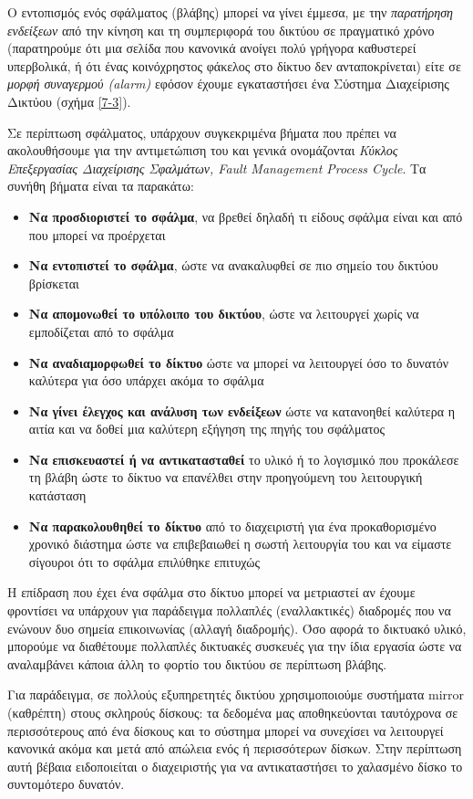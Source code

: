 Ο εντοπισμός ενός σφάλματος (βλάβης) μπορεί να γίνει έμμεσα, με την \emph{παρατήρηση ενδείξεων} από την κίνηση και τη συμπεριφορά του δικτύου σε πραγματικό χρόνο (παρατηρούμε ότι μια σελίδα που κανονικά ανοίγει πολύ γρήγορα καθυστερεί υπερβολικά, ή ότι ένας κοινόχρηστος φάκελος στο δίκτυο δεν ανταποκρίνεται) είτε σε \emph{μορφή συναγερμού (alarm)} εφόσον έχουμε εγκαταστήσει ένα Σύστημα Διαχείρισης Δικτύου (σχήμα \ref{7-3}). 

Σε περίπτωση σφάλματος, υπάρχουν συγκεκριμένα βήματα που πρέπει να ακολουθήσουμε για την αντιμετώπιση του και γενικά ονομάζονται \emph{Κύκλος Επεξεργασίας Διαχείρισης Σφαλμάτων, Fault Management Process Cycle}. Τα συνήθη βήματα είναι τα παρακάτω:

\begin{itemize}
\item \textbf{Να προσδιοριστεί το σφάλμα}, να βρεθεί δηλαδή τι είδους σφάλμα είναι και από που μπορεί να προέρχεται
\item \textbf{Να εντοπιστεί το σφάλμα}, ώστε να ανακαλυφθεί σε πιο σημείο του δικτύου βρίσκεται
\item \textbf{Να απομονωθεί το υπόλοιπο του δικτύου}, ώστε να λειτουργεί χωρίς να εμποδίζεται από το σφάλμα
\item \textbf{Να αναδιαμορφωθεί το δίκτυο} ώστε να μπορεί να λειτουργεί όσο το δυνατόν καλύτερα για όσο υπάρχει ακόμα το σφάλμα
\item \textbf{Να γίνει έλεγχος και ανάλυση των ενδείξεων} ώστε να κατανοηθεί καλύτερα η αιτία και να δοθεί μια καλύτερη εξήγηση της πηγής του σφάλματος
\item \textbf{Να επισκευαστεί ή να αντικατασταθεί} το υλικό ή το λογισμικό που προκάλεσε τη βλάβη ώστε το δίκτυο να επανέλθει στην προηγούμενη του λειτουργική κατάσταση
\item \textbf{Να παρακολουθηθεί το δίκτυο} από το διαχειριστή για ένα προκαθορισμένο χρονικό διάστημα ώστε να επιβεβαιωθεί η σωστή λειτουργία του και να είμαστε σίγουροι ότι το σφάλμα επιλύθηκε επιτυχώς
\end{itemize}

Η επίδραση που έχει ένα σφάλμα στο δίκτυο μπορεί να μετριαστεί αν έχουμε φροντίσει να υπάρχουν για παράδειγμα πολλαπλές (εναλλακτικές) διαδρομές που να ενώνουν δυο σημεία επικοινωνίας (αλλαγή διαδρομής). Όσο αφορά το δικτυακό υλικό, μπορούμε να διαθέτουμε πολλαπλές δικτυακές συσκευές για την ίδια εργασία ώστε να αναλαμβάνει κάποια άλλη το φορτίο του δικτύου σε περίπτωση βλάβης. 

Για παράδειγμα, σε πολλούς εξυπηρετητές δικτύου χρησιμοποιούμε συστήματα mir\-ror (καθρέπτη) στους σκληρούς δίσκους: τα δεδομένα μας αποθηκεύονται ταυτόχρονα σε περισσότερους από ένα δίσκους και το σύστημα μπορεί να συνεχίσει να λειτουργεί κανονικά ακόμα και μετά από απώλεια ενός ή περισσότερων δίσκων. Στην περίπτωση αυτή βέβαια ειδοποιείται ο διαχειριστής για να αντικαταστήσει το χαλασμένο δίσκο το συντομότερο δυνατόν.

